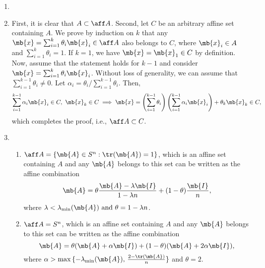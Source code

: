 \begin{exercise}
\begin{enumerate}
      \begin{solution}
        \begin{enumerate}
          \item []
          \item First, it is clear that $A \subset \aff A$. Second, let $C$ be an arbitrary affine set containing $A$. We prove by induction on $k$ that any $\mb{x} = \sum_{i=1}^k \theta_i \mb{x}_i \in \aff A$ also belongs to $C$, where $\mb{x}_i \in A$ and $\sum_{i=1}^k \theta_i = 1$. If $k=1$, we have $\mb{x} = \mb{x}_1 \in C$ by definition. Now, assume that the statement holds for $k-1$ and consider $\mb{x} = \sum_{i=1}^k \theta_i \mb{x}_i$. Without loss of generality, we can assume that $\sum_{i=1}^{k-1} \theta_i\neq 0$. Let $\alpha_i = \theta_i / \sum_{i=1}^{k-1} \theta_i$. Then,
            $$\sum_{i=1}^{k-1} \alpha_i \mb{x}_i\in C,\ \mb{x}_k\in C \implies \mb{x} = \left(\sum_{i=1}^{k-1} \theta_i\right) \left(\sum_{i=1}^{k-1} \alpha_i \mb{x}_i\right) + \theta_k \mb{x}_k\in C,$$ which completes the proof, i.e., $\aff A \subset C$.
          \item 
            \begin{enumerate}
              \item $\aff A = \{ \mb{A} \in S^n: \tr(\mb{A}) = 1 \}$, which is an affine set containing $A$ and any $\mb{A}$ belongs to this set can be written as the affine combination $$\mb{A} = \theta \frac{\mb{A} - \lambda\mb{I}}{1-\lambda n} + (1-\theta) \frac{\mb{I}}{n},$$ where $\lambda < \lambda_{\min}(\mb{A})\ \text{and}\ \theta = 1-\lambda n$.
              \item $\aff A = S^n$, which is an affine set containing $A$ and any $\mb{A}$ belongs to this set can be written as the affine combination $$\mb{A} = \theta (\mb{A} + \alpha \mb{I}) + (1-\theta) (\mb{A} + 2\alpha \mb{I}), $$ where $\alpha > \max\, \{-\lambda_{\min} (\mb{A}),\, \frac{2-\tr(\mb{A})}{n} \}$ and $\theta = 2$.\qedhere
            \end{enumerate}
        \end{enumerate}
      \end{solution}
  \end{enumerate}

\end{exercise}
\newpage



